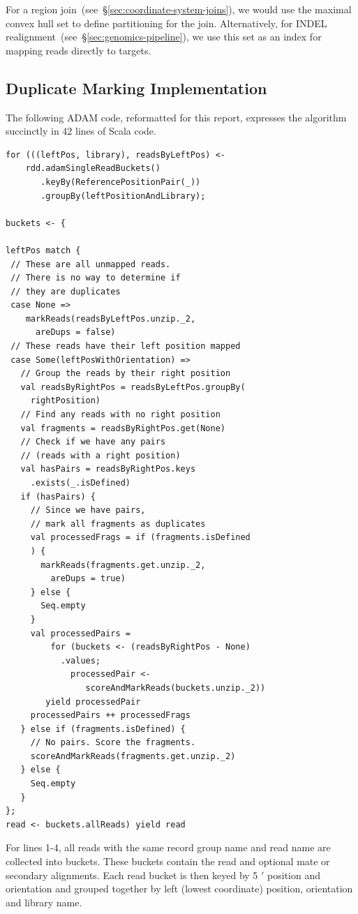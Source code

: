 \documentclass[masters]{ucbthesis}
\begin{document}
For a region join~(see~\S\ref{sec:coordinate-system-joins}), we would use the maximal convex hull
set to define partitioning for the join. Alternatively, for INDEL
realignment~(see~\S\ref{sec:genomics-pipeline}), we use this set as an index for mapping reads directly
to targets.

\subsection{Duplicate Marking Implementation}
\label{sec:duplicate-marking-implementation}

The following ADAM code, reformatted for this report, expresses the algorithm succinctly in 42 lines of Scala code.

\begin{lstlisting}
for (((leftPos, library), readsByLeftPos) <- 
    rdd.adamSingleReadBuckets()
       .keyBy(ReferencePositionPair(_))
       .groupBy(leftPositionAndLibrary);

buckets <- {

leftPos match {
 // These are all unmapped reads. 
 // There is no way to determine if
 // they are duplicates
 case None =>
    markReads(readsByLeftPos.unzip._2,
      areDups = false)
 // These reads have their left position mapped
 case Some(leftPosWithOrientation) =>
   // Group the reads by their right position
   val readsByRightPos = readsByLeftPos.groupBy(
     rightPosition)
   // Find any reads with no right position
   val fragments = readsByRightPos.get(None)
   // Check if we have any pairs
   // (reads with a right position)
   val hasPairs = readsByRightPos.keys
     .exists(_.isDefined)
   if (hasPairs) {
     // Since we have pairs,
     // mark all fragments as duplicates
     val processedFrags = if (fragments.isDefined
     ) {
       markReads(fragments.get.unzip._2,
         areDups = true)
     } else {
       Seq.empty
     }
     val processedPairs = 
         for (buckets <- (readsByRightPos - None)
           .values;
             processedPair <- 
                scoreAndMarkReads(buckets.unzip._2)) 
        yield processedPair
     processedPairs ++ processedFrags
   } else if (fragments.isDefined) {
     // No pairs. Score the fragments.
     scoreAndMarkReads(fragments.get.unzip._2)
   } else {
     Seq.empty
   }
};
read <- buckets.allReads) yield read
\end{lstlisting}

For lines 1-4, all reads with the same record group name and read name are collected 
into buckets. These buckets contain the read and optional mate or secondary alignments.
Each read bucket is then keyed by 5 $'$ position and orientation and grouped together by
left (lowest coordinate) position, orientation and library name.
\end{document}
